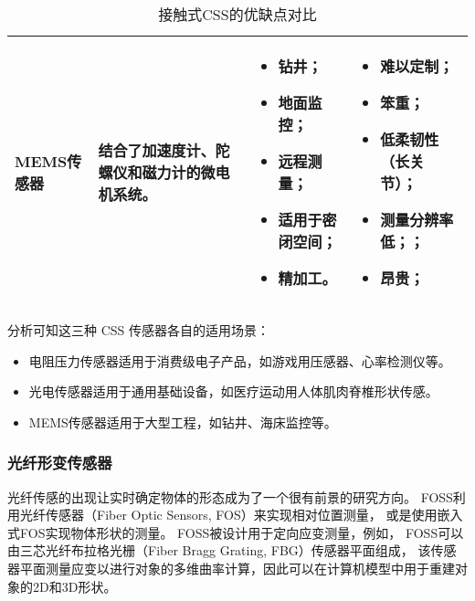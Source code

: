 \begin{table}[!htbp]
\begin{center}
\begin{tabular}{p{}p{}p{}p{}}
\midrule

MEMS传感器 & 结合了加速度计、陀螺仪和磁力计的微电机系统。&
\begin{itemize}
\setlength{\itemsep}{0pt}
\setlength{\parsep}{0pt}
\setlength{\parskip}{0pt}
    \item 钻井；
    \item 地面监控；
    \item 远程测量；
    \item 适用于密闭空间；
    \item 精加工。
\end{itemize}
& 
\begin{itemize}
\setlength{\itemsep}{0pt}
\setlength{\parsep}{0pt}
\setlength{\parskip}{0pt}
    \item 难以定制；
    \item 笨重；
    \item 低柔韧性（长关节）；
    \item 测量分辨率低；；
    \item 昂贵；
\end{itemize} \\
\bottomrule
\end{tabular}
\caption{接触式CSS的优缺点对比}
\end{center}
\end{table}

分析可知这三种 CSS 传感器各自的适用场景：

\begin{itemize}
    \item 电阻压力传感器适用于消费级电子产品，如游戏用压感器、心率检测仪等。
    \item 光电传感器适用于通用基础设备，如医疗运动用人体肌肉脊椎形状传感。
    \item MEMS传感器适用于大型工程，如钻井、海床监控等。
\end{itemize}

\subsubsection{光纤形变传感器}

光纤传感的出现让实时确定物体的形态成为了一个很有前景的研究方向。
FOSS利用光纤传感器（Fiber Optic Sensors, FOS）来实现相对位置测量，
或是使用嵌入式FOS实现物体形状的测量。
FOSS被设计用于定向应变测量，例如，
FOSS可以由三芯光纤布拉格光栅（Fiber Bragg Grating, FBG）传感器平面组成，
该传感器平面测量应变以进行对象的多维曲率计算，因此可以在计算机模型中用于重建对象的2D和3D形状。

